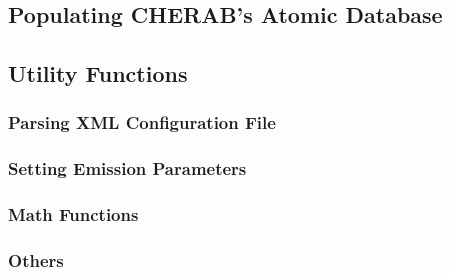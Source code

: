 \documentclass[../main.tex]{subfiles}
\begin{document}
\subsection{Populating CHERAB's Atomic Database}%
\label{sec:atomic}

\subsection{Utility Functions}%
\label{sec:utility}

\subsubsection{Parsing XML Configuration File}%
\label{sec:xml}

\subsubsection{Setting Emission Parameters}%
\label{sec:emission}

\subsubsection{Math Functions}%
\label{sec:math}

\subsubsection{Others}%
\label{sec:other}
\end{document}
